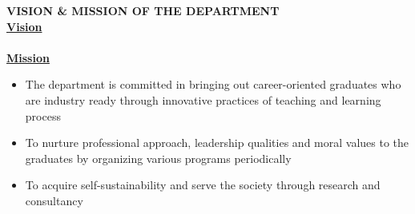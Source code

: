 \thispagestyle{empty}
\begin{center}
 \vspace*{1cm}
    \Large \textbf{ VISION \& MISSION OF THE DEPARTMENT}
     \vspace*{2.0cm}
    \\ {\Large \bf \underline{Vision}}
    \\ \vspace{1.0cm}{
    \normalsize To evolve as a school of computing with globally reputed Centre's of excellence
and serve the changing needs of the industry and society.}
 \vspace*{2.0cm}
    \\ {\Large \bf \underline{Mission}}
    \\ \vspace{1.0cm}
  \begin{itemize}
 \normalsize \item The department is committed in bringing out career-oriented graduates who are
industry ready through innovative practices of teaching and learning process
\item \normalsize To nurture professional approach, leadership qualities and moral values to the
graduates by organizing various programs periodically
\item \normalsize To acquire self-sustainability and serve the society through research and
consultancy
  \end{itemize}
\end{center}